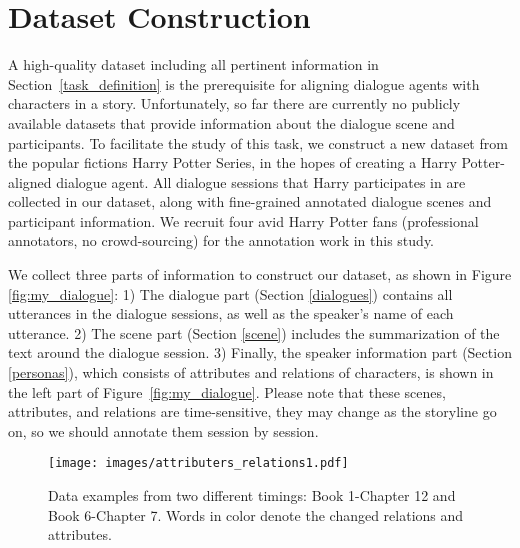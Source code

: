 \documentclass[11pt]{article}
\begin{document}
\section{Dataset Construction}
\label{dataset_collection}

A high-quality dataset including all pertinent information in Section~\ref{task_definition} is the prerequisite for aligning dialogue agents with characters in a story. Unfortunately, so far there are currently no publicly available datasets that provide information about the dialogue scene and participants. To facilitate the study of this task, we construct a new dataset from the popular fictions Harry Potter Series, in the hopes of creating a Harry Potter-aligned dialogue agent. All dialogue sessions that Harry participates in are collected in our dataset, along with fine-grained annotated dialogue scenes and participant information. We recruit four avid  Harry Potter fans (professional annotators, no crowd-sourcing) for the annotation work in this study.




We collect three parts of information to construct our dataset, as shown in Figure \ref{fig:my_dialogue}:
1) The dialogue part (Section \ref{dialogues}) contains all utterances in the dialogue sessions, as well as the speaker's name of each utterance. 2) The scene part (Section \ref{scene}) includes the summarization of the text around the dialogue session. 3) Finally, the speaker information part (Section \ref{personas}), which consists of attributes and relations of characters, is shown in the left part of Figure~\ref{fig:my_dialogue}.
Please note that these scenes, attributes, and relations are time-sensitive, they may change as the storyline go on, 
so we should annotate them session by session.















\begin{figure*}
    \centering
    \texttt{[image: images/attributers\_relations1.pdf]}
    \caption{Data examples from two different timings: Book 1-Chapter 12 and Book 6-Chapter 7. Words in color denote the changed relations and attributes.}
\vspace{-10pt}
    \label{fig:attributes_relations}
\end{figure*}
\end{document}
